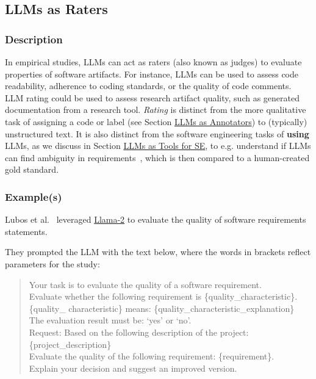 \subsection{LLMs as Raters}

\subsubsection{Description}

In empirical studies, LLMs can act as raters (also known as judges) to evaluate properties of software artifacts.%
For instance, LLMs can be used to assess code readability, adherence to coding standards, or the quality of code comments. LLM rating could be used to assess research artifact quality, such as generated documentation from a research tool.
\emph{Rating} is distinct from the more qualitative task of assigning a code or label (see Section \href{/study-types/#llms-as-annotators}{LLMs as Annotators}) to (typically) unstructured text.
It is also distinct from the software engineering tasks of \textbf{using} LLMs, as we discuss in Section \href{/study-types/#introduction-llms-as-tools-for-software-engineers}{LLMs as Tools for SE}, to e.g. understand if LLMs can find ambiguity in requirements~\cite{DBLP:conf/icse/EzziniA0S22}, which is then compared to a human-created gold standard.

\subsubsection{Example(s)}
Lubos et al.~\cite{DBLP:conf/re/LubosFTGMEL24} leveraged \href{https://www.llama.com/llama2/}{Llama-2} to evaluate the quality of software requirements statements. 

They prompted the LLM with the text below, where the words in brackets reflect parameters for the study:

\begin{quote}
Your task is to evaluate the quality of a software requirement.\\
Evaluate whether the following requirement is \{quality\_characteristic\}. \\
\{quality\_ characteristic\} means: \{quality\_characteristic\_explanation\}\\
The evaluation result must be: `yes' or `no'.\\
Request: Based on the following description of the project:
\{project\_description\}\\
Evaluate the quality of the following requirement: \{requirement\}.\\
Explain your decision and suggest an improved version.\\
\end{quote}

